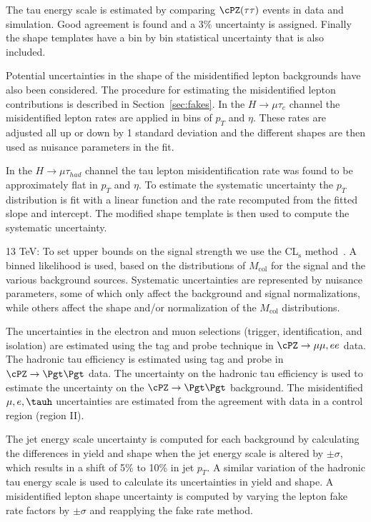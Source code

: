 The tau energy scale is estimated by comparing $\cPZ(\tau \tau)$ events in data and simulation. Good agreement is found and a 3\% uncertainty is assigned. Finally the shape templates have a bin by bin statistical uncertainty that is also included.


Potential uncertainties in the shape of the misidentified lepton backgrounds have also been considered. The
procedure for estimating the misidentified lepton contributions is described in
Section~\ref{sec:fakes}.
In the \mbox{$H \rightarrow \mu \tau_{e}$} channel the misidentified lepton rates are applied in bins of $p_{T}$ and $\eta$. These rates are
adjusted all up or down by 1 standard deviation and the different shapes are then used as nuisance parameters in the fit.

In the $H \rightarrow \mu \tau_{had}$ channel the tau lepton misidentification rate was found to be approximately flat in $p_{T}$ and $\eta$. To
estimate the systematic uncertainty the $p_{T}$ distribution is fit with a linear function and
the rate recomputed from the fitted slope and intercept. The modified shape template is then
used to compute the systematic uncertainty.




13 TeV:
To set upper bounds on the signal strength  we use the
CL$_{\mathrm{s}}$ method~\cite{Junk,Read2}.  A binned likelihood is used, based on the
distributions of $M_\text{col}$ for the signal and the various background sources.
Systematic uncertainties are represented by nuisance parameters, some of which only affect
the background and signal normalizations, while  others affect the shape and/or
normalization of the $M_\text{col}$ distributions.

The uncertainties in the electron and muon selections (trigger, identification, and isolation) are estimated using the tag and probe technique in $\cPZ \rightarrow \mu \mu, e e$ data. The hadronic tau efficiency is estimated using tag and probe in $\cPZ \rightarrow \Pgt \Pgt$ data. The uncertainty on the hadronic tau efficiency is used to estimate the uncertainty on the $\cPZ \rightarrow \Pgt \Pgt$ background. The misidentified $\mu, e, \tauh$ uncertainties are estimated from the agreement with data in a control region (region II).

The jet energy scale uncertainty is computed for each background by calculating the differences in yield and shape when the jet energy scale is altered by $\pm\sigma$, which results in a shift of 5\% to 10\% in jet $p_{T}$. A similar variation of the hadronic tau energy scale is used to calculate its uncertainties in yield and shape. A misidentified lepton shape uncertainty is computed by varying the lepton fake rate factors by $\pm\sigma$ and reapplying the fake rate method.

